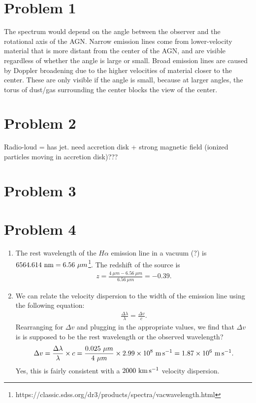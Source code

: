\documentclass[11pt,letterpaper]{article}
\begin{document}
\section*{Problem 1}

The spectrum would depend on the angle between the observer and the rotational axis of the AGN. Narrow emission lines come from lower-velocity material that is more distant from the center of the AGN, and are visible regardless of whether the angle is large or small. Broad emission lines are caused by Doppler broadening due to the higher velocities of material closer to the center. These are only visible if the angle is small, because at larger angles, the torus of dust/gas surrounding the center blocks the view of the center. 

\section*{Problem 2}

Radio-loud = has jet. need accretion disk + strong magnetic field (ionized particles moving in accretion disk)???

\section*{Problem 3}

\section*{Problem 4}

\begin{enumerate}[label=(\roman*)]
    \item The rest wavelength of the $H\alpha$ emission line in a vacuum (?) is $6564.614~{\rm nm} = 6.56~{\mu m}$\footnote{https://classic.sdss.org/dr3/products/spectra/vacwavelength.html}. The redshift of the source is 
        \begin{align*}
            z = \frac{4~{\mu m} - 6.56~{\mu m}}{6.56~{\mu m}} = -0.39.
        \end{align*}

    \item We can relate the velocity dispersion to the width of the emission line using the following equation:
        \begin{align*}
            \frac{\Delta \lambda}{\lambda} = \frac{\Delta v}{c}.
        \end{align*}
        Rearranging for $\Delta v$ and plugging in the appropriate values, we find that $\Delta v$ is {\huge is \lambda supposed to be the rest wavelength or the observed wavelength?}
        \begin{align*}
            \Delta v = \frac{\Delta \lambda}{\lambda}\times c = \frac{0.025~{\mu m}}{4~{\mu m}}\times 2.99\times 10^{8}~{\rm m\,s^{-1}} = 1.87\times 10^{6}~{\rm m\,s^{-1}}.
        \end{align*}
        Yes, this is fairly consistent with a $2000~{\rm km\,s^{-1}}$ velocity dispersion.
\end{enumerate}
\end{document}

